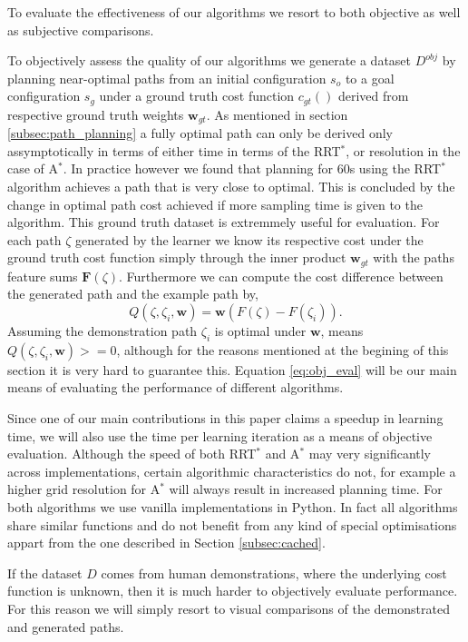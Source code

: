 \documentclass{article}  %
\begin{document}
	To evaluate the effectiveness of our algorithms we resort to both objective as well as subjective comparisons.

	To objectively assess the quality of our algorithms we generate a dataset $D^{obj}$ by planning near-optimal paths from an initial configuration $s_o$ to a goal configuration $s_g$ under a ground truth cost function $c_{gt}()$ derived from respective ground truth weights $\mathbf{w}_{gt}$. As mentioned in section \ref{subsec:path_planning} a fully optimal path can only be derived only assymptotically in terms of either time in terms of the RRT$^*$, or resolution in the case of A$^*$. In practice however we found that planning for 60s using the RRT$^*$ algorithm achieves a path that is very close to optimal. This is concluded by the change in optimal path cost achieved if more sampling time is given to the algorithm. This ground truth dataset is extremmely useful for evaluation. For each path $\zeta$ generated by the learner we know its respective cost under the ground truth cost function simply through the inner product $\mathbf{w}_{gt}$ with the paths feature sums $\mathbf{F}(\zeta)$. Furthermore we can compute the cost difference between the generated path and the example path by,
	\begin{equation}
		Q(\zeta,\zeta_i,\mathbf{w}) = \mathbf{w}(F(\zeta)-F(\zeta_i)). \label{eq:obj_eval}
	\end{equation} 
	Assuming the demonstration path $\zeta_i$ is optimal under $\mathbf{w}$, means $Q(\zeta,\zeta_i,\mathbf{w})>=0$, although for the reasons mentioned at the begining of this section it is very hard to guarantee this. Equation \ref{eq:obj_eval} will be our main means of evaluating the performance of different algorithms.

	Since one of our main contributions in this paper claims a speedup in learning time, we will also use the time per learning iteration as a means of objective evaluation. Although the speed of both RRT$^*$ and A$^*$ may very significantly across implementations, certain algorithmic characteristics do not, for example a higher grid resolution for A$^*$ will always result in increased planning time. For both algorithms we use vanilla implementations in Python. In fact all algorithms share similar functions and do not benefit from any kind of special optimisations appart from the one described in Section \ref{subsec:cached}.


	If the dataset $D$ comes from human demonstrations, where the underlying cost function is unknown, then it is much harder to objectively evaluate performance. For this reason we will simply resort to visual comparisons of the demonstrated and generated paths.
\end{document}
